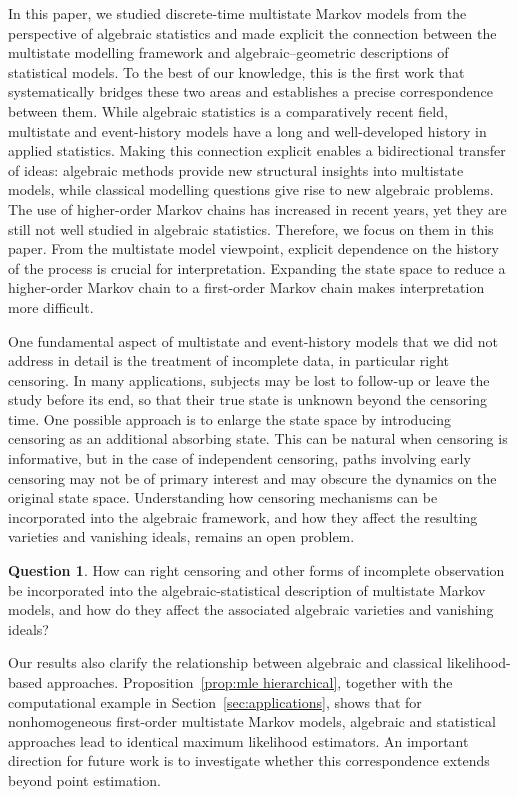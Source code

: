\documentclass[11pt, a4paper]{article}
\numberwithin{equation}{section}
\theoremstyle{plain}
\theoremstyle{definition}
\newtheorem{question}{Question}
\begin{document}
In this paper, we studied discrete-time multistate Markov models from the perspective of
algebraic statistics and made explicit the connection between the multistate modelling
framework and algebraic–geometric descriptions of statistical models.
To the best of our knowledge, this is the first work that systematically bridges these two
areas and establishes a precise correspondence between them.
While algebraic statistics is a comparatively recent field, multistate and event-history
models have a long and well-developed history in applied statistics.
Making this connection explicit enables a bidirectional transfer of ideas: algebraic methods
provide new structural insights into multistate models, while classical modelling questions
give rise to new algebraic problems. The use of higher-order Markov chains has increased in recent years, yet they are still not well studied in algebraic statistics. Therefore, we focus on them in this paper. From the multistate model viewpoint, explicit dependence on the history of the process is crucial for interpretation. Expanding the state space to reduce a higher-order Markov chain to a first-order Markov chain makes interpretation more difficult.


One fundamental aspect of multistate and event-history models that we did not address in
detail is the treatment of incomplete data, in particular right censoring.
In many applications, subjects may be lost to follow-up or leave the study before its end, so
that their true state is unknown beyond the censoring time.
One possible approach is to enlarge the state space by introducing censoring as an additional
absorbing state.
This can be natural when censoring is informative, but in the case of independent censoring,
paths involving early censoring may not be of primary interest and may obscure the dynamics
on the original state space.
Understanding how censoring mechanisms can be incorporated into the algebraic framework, and
how they affect the resulting varieties and vanishing ideals, remains an open problem.

\begin{question}
How can right censoring and other forms of incomplete observation be incorporated into the
algebraic-statistical description of multistate Markov models, and how do they affect the
associated algebraic varieties and vanishing ideals?
\end{question}

Our results also clarify the relationship between algebraic and classical likelihood-based
approaches.
Proposition~\ref{prop:mle hierarchical}, together with the computational 
example in
Section~\ref{sec:applications}, shows that for nonhomogeneous first-order multistate Markov
models, algebraic and statistical approaches lead to identical maximum likelihood estimators.
An important direction for future work is to investigate whether this correspondence extends
beyond point estimation.
\end{document}
